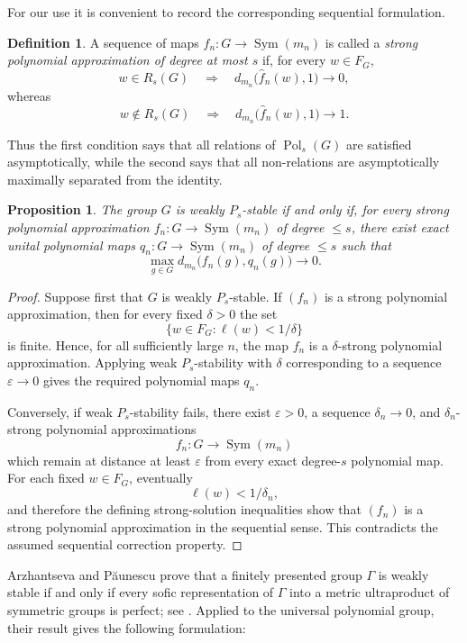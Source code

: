 \documentclass[a4paper,12pt]{amsart}
\theoremstyle{plain}
\newtheorem{proposition}[subsection]{{\bf Proposition}}
\theoremstyle{definition}
\newtheorem*{definition}{{\bf Definition}}
\theoremstyle{remark}
\numberwithin{equation}{subsection}
\DeclareMathOperator{\Sym}{Sym}
\DeclareMathOperator{\Pold}{Pol}
\begin{document}
For our use it is convenient to record the corresponding sequential
formulation.

\begin{definition}
A sequence of maps
$f_n:G\longrightarrow\Sym(m_n)$
is called a \emph{strong polynomial approximation of degree at most
$s$} if, for every $w\in F_G$,
\[
w\in R_s(G)
\quad\Longrightarrow\quad
d_{m_n}\bigl(\widehat f_n(w),1\bigr)\longrightarrow0,
\]
whereas
\[
w\notin R_s(G)
\quad\Longrightarrow\quad
d_{m_n}\bigl(\widehat f_n(w),1\bigr)\longrightarrow1.
\]
\end{definition}

Thus the first condition says that all relations of $\Pold_s(G)$ are
satisfied asymptotically, while the second says that all non-relations
are asymptotically maximally separated from the identity.

\begin{proposition}
\label{prop:weak-Ps-sequential}
The group $G$ is weakly $P_s$-stable if and only if, for every strong
polynomial approximation
$f_n:G\longrightarrow\Sym(m_n)$
of degree $\le s$, there exist exact unital polynomial maps
$q_n:G\longrightarrow\Sym(m_n)$
of degree $\le s$
such that
$$
\max_{g\in G}
d_{m_n}\bigl(f_n(g),q_n(g)\bigr)
\longrightarrow0.
$$
\end{proposition}

\begin{proof}
Suppose first that $G$ is weakly $P_s$-stable.  If $(f_n)$ is a
strong polynomial approximation, then for every fixed $\delta>0$ the
set
\[
\{w\in F_G:\ell(w)<1/\delta\}
\]
is finite.  Hence, for all sufficiently large $n$, the map $f_n$ is a
$\delta$-strong polynomial approximation.  Applying weak
$P_s$-stability with $\delta$ corresponding to a sequence
$\varepsilon\to0$ gives the required polynomial maps $q_n$.

Conversely, if weak $P_s$-stability fails, there exist
$\varepsilon>0$, a sequence $\delta_n\to0$, and
$\delta_n$-strong polynomial approximations
\[
f_n:G\to\Sym(m_n)
\]
which remain at distance at least $\varepsilon$ from every exact
degree-$s$ polynomial map.  For each fixed $w\in F_G$, eventually
\[
\ell(w)<1/\delta_n,
\]
and therefore the defining strong-solution inequalities show that
$(f_n)$ is a strong polynomial approximation in the sequential
sense.  This contradicts the assumed sequential correction property.
\end{proof}
Arzhantseva and P\u{a}unescu prove that a finitely presented group
$\Gamma$ is weakly stable if and only if every sofic representation of
$\Gamma$ into a metric ultraproduct of symmetric groups is perfect;
see \cite[Definition 4.1 and Theorem 7.2(i)]{AP15}.
Applied to the universal polynomial group, their result gives the
following formulation:
\end{document}
